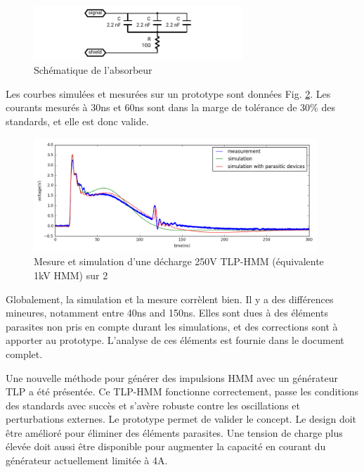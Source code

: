 \begin{figure}[!h]
  \centering
  \includegraphics[width=0.7\textwidth]{src/1/figures/absorber_schematic.pdf}
  \caption{Schématique de l'absorbeur}
  \label{fig:absorber_schematic}
\end{figure}

Les courbes simulées et mesurées sur un prototype sont données Fig. \ref{fig:tlp_hmm_waveforms}.
Les courants mesurés à 30ns et 60ns sont dans la marge de tolérance de 30\% des standards, et elle est donc valide.

\begin{figure}[!h]
  \centering
  \includegraphics[width=0.95\textwidth]{src/1/figures/tlp_hmm_waveforms.png}
  \caption{Mesure et simulation d'une décharge 250V TLP-HMM (équivalente 1kV HMM) sur 2\textOmega{}}
  \label{fig:tlp_hmm_waveforms}
\end{figure}

Globalement, la simulation et la mesure corrèlent bien.
Il y a des différences mineures, notamment entre 40ns and 150ns.
Elles sont dues à des éléments parasites non pris en compte durant les simulations, et des corrections sont à apporter au prototype.
L'analyse de ces éléments est fournie dans le document complet.

Une nouvelle méthode pour générer des impulsions HMM avec un générateur TLP a été présentée.
Ce TLP-HMM fonctionne correctement, passe les conditions des standards avec succès et s'avère robuste contre les oscillations et perturbations externes.
Le prototype permet de valider le concept.
Le design doit être amélioré pour éliminer des éléments parasites.
Une tension de charge plus élevée doit aussi être disponible pour augmenter la capacité en courant du générateur actuellement limitée à 4A.

